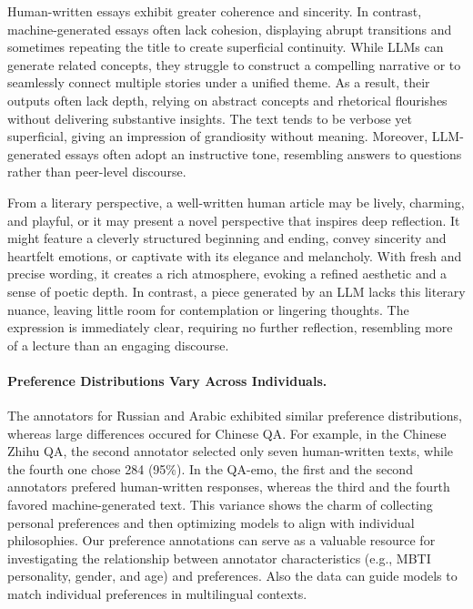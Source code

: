 Human-written essays exhibit greater coherence and sincerity. In contrast, machine-generated essays often lack cohesion, displaying abrupt transitions and sometimes repeating the title to create superficial continuity. While LLMs can generate related concepts, they struggle to construct a compelling narrative or to seamlessly connect multiple stories under a unified theme. As a result, their outputs often lack depth, relying on abstract concepts and rhetorical flourishes without delivering substantive insights. The text tends to be verbose yet superficial, giving an impression of grandiosity without meaning. Moreover, LLM-generated essays often adopt an instructive tone, resembling answers to questions rather than peer-level discourse.


From a literary perspective, a well-written human article may be lively, charming, and playful, or it may present a novel perspective that inspires deep reflection. It might feature a cleverly structured beginning and ending, convey sincerity and heartfelt emotions, or captivate with its elegance and melancholy. With fresh and precise wording, it creates a rich atmosphere, evoking a refined aesthetic and a sense of poetic depth.  
In contrast, a piece generated by an LLM lacks this literary nuance, leaving little room for contemplation or lingering thoughts. The expression is immediately clear, requiring no further reflection, resembling more of a lecture than an engaging discourse.


\paragraph{Preference Distributions Vary Across Individuals.}
The annotators for Russian and Arabic exhibited similar preference distributions, whereas large differences occured for Chinese QA.
For example, in the Chinese Zhihu QA, the second annotator selected only seven human-written texts, while the fourth one chose 284 (95\%). In the QA-emo, the first and the second annotators prefered human-written responses, whereas the third and the fourth favored machine-generated text.
This variance shows the charm of collecting personal preferences and then optimizing models to align with individual philosophies. 
Our preference annotations can serve as a valuable resource for investigating the relationship between annotator characteristics (e.g., MBTI personality, gender, and age) and preferences. Also the data can guide models to match individual preferences in multilingual contexts.



